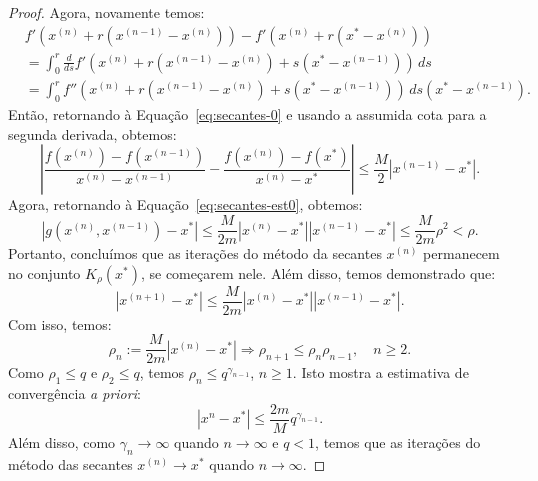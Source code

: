 \begin{proof}
Agora, novamente temos:
\begin{equation*}
  \begin{split}
  &f'(x^{(n)} + r(x^{(n-1)} - x^{(n)})) - f'(x^{(n)} + r(x^* - x^{(n)}))\\
  &= \int_0^r \frac{d}{ds}f'(x^{(n)} + r(x^{(n-1)} - x^{(n)}) + s(x^* - x^{(n-1)}))\,ds\\
  &= \int_0^r f''(x^{(n)} + r(x^{(n-1)} - x^{(n)}) + s(x^* - x^{(n-1)}))\,ds(x^* - x^{(n-1)}).
  \end{split}
\end{equation*}
Então, retornando à Equação~\eqref{eq:secantes-0} e usando a assumida cota para a segunda derivada, obtemos:
\begin{equation*}
  \left|\frac{f(x^{(n)}) - f(x^{(n-1)})}{x^{(n)} - x^{(n-1)}} - \frac{f(x^{(n)}) - f(x^*)}{x^{(n)} - x^*} \right| \leq \frac{M}{2}|x^{(n-1)} - x^*|.
\end{equation*}
Agora, retornando à Equação~\eqref{eq:secantes-est0}, obtemos:
\begin{equation*}
  |g(x^{(n)},x^{(n-1)})-x^*| \leq \frac{M}{2m}|x^{(n)}-x^*||x^{(n-1)}-x^*| \leq \frac{M}{2m}\rho^2 < \rho.
\end{equation*}
Portanto, concluímos que as iterações do método da secantes $x^{(n)}$ permanecem no conjunto $K_\rho(x^*)$, se começarem nele. Além disso, temos demonstrado que:
\begin{equation*}
  |x^{(n+1)} - x^*| \leq \frac{M}{2m}|x^{(n)} - x^*||x^{(n-1)} - x^*|.
\end{equation*}
Com isso, temos:
\begin{equation*}
  \rho_n := \frac{M}{2m}|x^{(n)} - x^*| \Rightarrow \rho_{n+1} \leq \rho_{n}\rho_{n-1},\quad n\geq 2.
\end{equation*}
Como $\rho_1 \leq q$ e $\rho_2 \leq q$, temos $\rho_n \leq q^{\gamma_{n-1}}$, $n\geq 1$. Isto mostra a estimativa de convergência \emph{a priori}:
\begin{equation*}
  |x^{n} - x^*| \leq \frac{2m}{M}q^{\gamma_{n-1}}.
\end{equation*}
Além disso, como $\gamma_{n}\to \infty$ quando $n\to\infty$ e $q < 1$, temos que as iterações do método das secantes $x^{(n)}\to x^*$ quando $n\to \infty$.


\end{proof}
